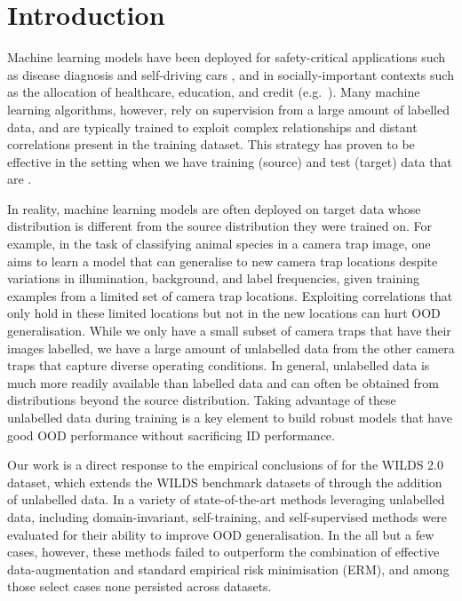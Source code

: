 \section{Introduction}\label{sec:intro}
Machine learning models have been deployed for safety-critical applications such as disease
diagnosis \citep{watson2019clinical} and self-driving cars \citep{yu2020bdd100k}, and in
socially-important contexts such as the allocation of healthcare, education, and credit (e.g.\
\citealp{DunYiLanReetal19, HurAde17}). 
%
%
Many machine learning algorithms, however, rely on supervision from a large amount of labelled
data, and are typically trained to exploit complex relationships and distant correlations present
in the training dataset. 
%
This strategy has proven to be effective in the setting when we have training (source) and test
(target) data that are \iid{}.

In reality, machine learning models are often deployed on target data whose distribution is
different from the source distribution they were trained on. 
%
For example, in the task of classifying animal species in a camera trap image, one aims to learn a
model that can generalise to new camera trap locations despite variations in illumination,
background, and label frequencies, given training examples from a limited set of camera trap
locations.
%
Exploiting correlations that only hold in these limited locations but not in the new locations can
hurt \ac{OOD} generalisation.
%
While we only have a small subset of camera traps that have their images labelled, we have a large
amount of unlabelled data from the other camera traps that capture diverse operating conditions. 
%
In general, unlabelled data is much more readily available than labelled data and can often be
obtained from distributions beyond the source distribution.
%
Taking advantage of these unlabelled data during training is a key element to build robust models
that have good OOD performance without sacrificing \ac{ID} performance.
%

Our work is a direct response to the empirical conclusions of \citet{SagWeiLeeGaoetal22} for the
WILDS 2.0 dataset, which extends the WILDS benchmark datasets of \citet{koh2021wilds} through the
addition of unlabelled data.
%
In \citet{SagWeiLeeGaoetal22} a variety of state-of-the-art methods leveraging unlabelled data, including
domain-invariant, self-training, and self-supervised methods were evaluated for their ability to
improve OOD generalisation.
In the all but a few cases, however, these methods failed to outperform the combination of effective
data-augmentation and standard empirical risk minimisation (ERM), and among those select cases
none persisted across datasets.


